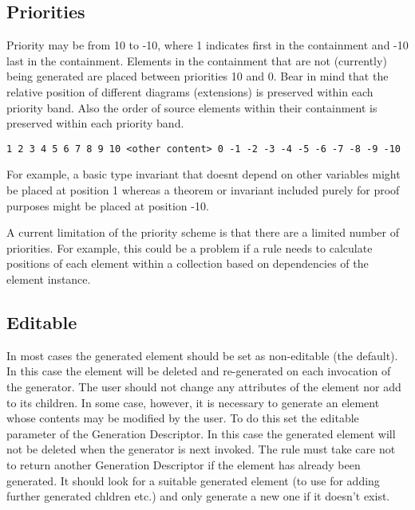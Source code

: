 \subsection{Priorities}
\label{sec:priorities}

Priority may be from 10 to -10, where 1 indicates first in the containment and -10 last in the containment. Elements in the containment that are not (currently) being generated are placed between priorities 10 and 0. Bear in mind that the relative position of different diagrams (extensions) is preserved within each priority band. Also the order of source elements within their containment is preserved within each priority band.

\begin{verbatim}
1 2 3 4 5 6 7 8 9 10 <other content> 0 -1 -2 -3 -4 -5 -6 -7 -8 -9 -10
\end{verbatim}

For example, a basic type invariant that doesnt depend on other variables might be placed at position 1 whereas a theorem or invariant included purely for proof purposes might be placed at position -10. 

A current limitation of the priority scheme is that there are a limited number of priorities. For example, this could be a problem if a rule needs to calculate positions of each element within a collection based on dependencies of the element instance.

\subsection{Editable}
\label{sec:editable}
In most cases the generated element should be set as non-editable (the default). In this case the element will be deleted and re-generated on each invocation of the generator. The user should not change any attributes of the element nor add to its children. In some case, however, it is necessary to generate an element whose contents may be modified by the user. To do this set the editable parameter of the Generation Descriptor. In this case the generated element will not be deleted when the generator is next invoked. The rule must take care not to return another Generation Descriptor if the element has already been generated. It should look for a suitable generated element (to use for adding further generated chldren etc.) and only generate a new one if it doesn't exist.

%
%


